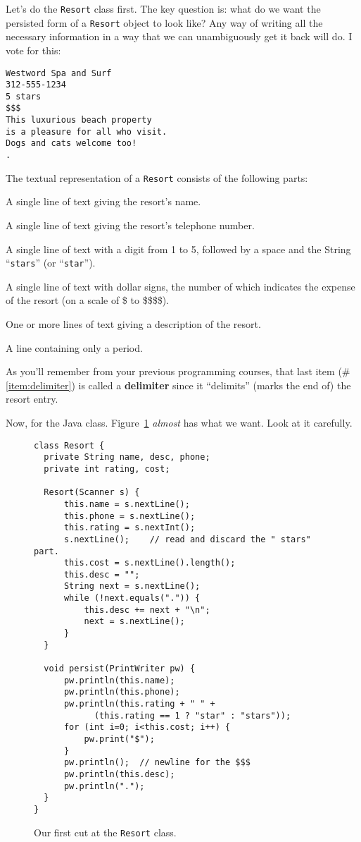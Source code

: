 Let's do the \texttt{Resort} class first. The key question is: what do we want
the persisted form of a \texttt{Resort} object to look like? Any way of
writing all the necessary information in a way that we can unambiguously get
it back will do. I vote for this:

\begin{Verbatim}[fontsize=\small,samepage=true,frame=lines]
Westword Spa and Surf
312-555-1234
5 stars
$$$
This luxurious beach property
is a pleasure for all who visit.
Dogs and cats welcome too!
.
\end{Verbatim}

The textual representation of a \texttt{Resort} consists of the following
parts:

\begin{compactenum}
\item A single line of text giving the resort's name.
\item A single line of text giving the resort's telephone number.
\item A single line of text with a digit from 1 to 5, followed by a space and
the String ``\texttt{stars}'' (or ``\texttt{star}'').
\item A single line of text with dollar signs, the number of which indicates
the expense of the resort (on a scale of \$ to \$\$\$\$).
\item One or more lines of text giving a description of the resort.
\item A line containing only a period. \label{item:delimiter}
\end{compactenum}

As you'll remember from your previous programming courses, that last item
(\#\ref{item:delimiter}) is called a \textbf{delimiter} since it ``delimits''
(marks the end of) the resort entry.

Now, for the Java class. Figure~\ref{fig:resort1} \textit{almost} has what we
want. Look at it carefully.

\begin{figure}[ht]
\centering
\begin{Verbatim}[fontsize=\footnotesize,samepage=true,frame=single]
class Resort {
  private String name, desc, phone;
  private int rating, cost;

  Resort(Scanner s) {
      this.name = s.nextLine();
      this.phone = s.nextLine();
      this.rating = s.nextInt();
      s.nextLine();    // read and discard the " stars" part.
      this.cost = s.nextLine().length();
      this.desc = "";
      String next = s.nextLine();
      while (!next.equals(".")) {
          this.desc += next + "\n";
          next = s.nextLine();
      }
  }
  
  void persist(PrintWriter pw) {
      pw.println(this.name);
      pw.println(this.phone);
      pw.println(this.rating + " " +
            (this.rating == 1 ? "star" : "stars"));
      for (int i=0; i<this.cost; i++) {
          pw.print("$");
      }
      pw.println();  // newline for the $$$
      pw.println(this.desc);
      pw.println(".");
  }
}
\end{Verbatim}
\caption{Our first cut at the \texttt{Resort} class.}
\label{fig:resort1}
\end{figure}


